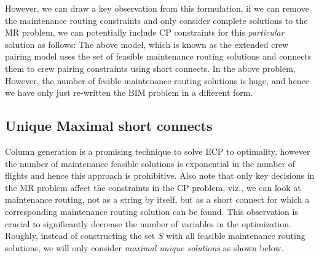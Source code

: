 \documentclass[letterpaper, 10pt, twocolumn, reqno]{amsart}
\begin{document}
However, we can draw a key observation from this formulation, if we can remove the maintenance routing constraints and only consider complete solutions to the MR problem, we can potentially include CP constraints for this \emph{particular} solution as follows:
The above model, which is known as the extended crew pairing model uses the set of feasible maintenance routing solutions and connects them to crew pairing constraints using short connects. In the above problem,
However, the number of fesible maintenance routing solutions is huge, and hence we have only just re-written the BIM problem in a different form.

\subsection{Unique Maximal short connects}
\label{ssec:unique_maximal_sc}

Column generation is a promising technique to solve ECP to optimality, however the number of maintenance feasible solutions is exponential in the number of flights and hence this approach is prohibitive. Also note that only key decisions in the MR problem affect the constraints in the CP problem, viz., we can look at maintenance routing, not as a string by itself, but as a short connect for which a corresponding maintenance routing solution can be found. This observation is crucial to significantly decrease the number of variables in the optimization. Roughly, instead of constructing the set $S$ with all feasible maintenance routing solutions, we will only consider \emph{maximal unique solutions} as shown below.
\end{document}
